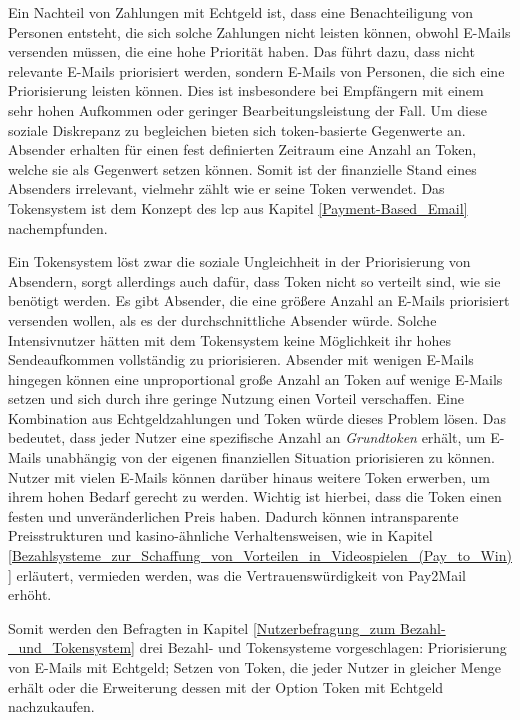 Ein Nachteil von Zahlungen mit Echtgeld ist, dass eine Benachteiligung von Personen entsteht, die sich solche Zahlungen nicht leisten können, obwohl E-Mails versenden müssen, die eine hohe Priorität haben. Das führt dazu, dass nicht relevante E-Mails priorisiert werden, sondern E-Mails von Personen, die sich eine Priorisierung leisten können. Dies ist insbesondere bei Empfängern mit einem sehr hohen Aufkommen oder geringer Bearbeitungsleistung der Fall. Um diese soziale Diskrepanz zu begleichen bieten sich token-basierte Gegenwerte an. Absender erhalten für einen fest definierten Zeitraum eine Anzahl an Token, welche sie als Gegenwert setzen können. Somit ist der finanzielle Stand eines Absenders irrelevant, vielmehr zählt wie er seine Token verwendet. Das Tokensystem ist dem Konzept des \acrshort{lcp} aus Kapitel \ref{Payment-Based_Email} nachempfunden. 

Ein Tokensystem löst zwar die soziale Ungleichheit in der Priorisierung von Absendern, sorgt allerdings auch dafür, dass Token nicht so verteilt sind, wie sie benötigt werden. Es gibt Absender, die eine größere Anzahl an E-Mails priorisiert versenden wollen, als es der durchschnittliche Absender würde. Solche Intensivnutzer hätten mit dem Tokensystem keine Möglichkeit ihr hohes Sendeaufkommen vollständig zu priorisieren. Absender mit wenigen E-Mails hingegen können eine unproportional große Anzahl an Token auf wenige E-Mails setzen und sich durch ihre geringe Nutzung einen Vorteil verschaffen. Eine Kombination aus Echtgeldzahlungen und Token würde dieses Problem lösen. Das bedeutet, dass jeder Nutzer eine spezifische Anzahl an \textit{Grundtoken} erhält, um E-Mails unabhängig von der eigenen finanziellen Situation priorisieren zu können. Nutzer mit vielen E-Mails können darüber hinaus weitere Token erwerben, um ihrem hohen Bedarf gerecht zu werden. Wichtig ist hierbei, dass die Token einen festen und unveränderlichen Preis haben. Dadurch können intransparente Preisstrukturen und kasino-ähnliche Verhaltensweisen, wie in Kapitel \ref{Bezahlsysteme_zur_Schaffung_von_Vorteilen_in_Videospielen_(Pay_to_Win)} erläutert, vermieden werden, was die Vertrauenswürdigkeit von Pay2Mail erhöht.

Somit werden den Befragten in Kapitel \ref{Nutzerbefragung_zum Bezahl-_und_Tokensystem} drei Bezahl- und Tokensysteme vorgeschlagen: Priorisierung von E-Mails mit Echtgeld; Setzen von Token, die jeder Nutzer in gleicher Menge erhält oder die Erweiterung dessen mit der Option Token mit Echtgeld nachzukaufen.

